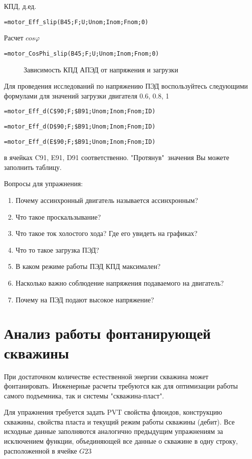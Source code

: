 КПД, д.ед.

{ \small  \texttt{=motor\_Eff\_slip(B45;F;U;Unom;Inom;Fnom;0)}}

Расчет $cos \varphi $

{ \small  \texttt{=motor\_CosPhi\_slip(B45;F;U;Unom;Inom;Fnom;0)}}


\begin{figure}[h!]
	\center{\texttt{[image: Ex80\_3]}}
	\caption{Зависимость КПД АПЭД от напряжения и загрузки}
	\label{ris:Ex80_3}
\end{figure}

Для проведения исследований по напряжению ПЭД воспользуйтесь следующими формулами для значений загрузки двигателя 0.6, 0.8, 1 

{ \small  \texttt{=motor\_Eff\_d(C\$90;F;\$B91;Unom;Inom;Fnom;ID)}}

{ \small  \texttt{=motor\_Eff\_d(D\$90;F;\$B91;Unom;Inom;Fnom;ID)}}

{ \small  \texttt{=motor\_Eff\_d(E\$90;F;\$B91;Unom;Inom;Fnom;ID)}}

в ячейках C91, E91, D91 соответственно. "Протянув"\ значения Вы можете заполнить таблицу.

Вопросы для упражнения:

\begin{enumerate}
	\item Почему ассинхронный двигатель называется ассинхронным?
	\item Что такое проскальзывание?
	\item Что такое ток холостого хода? Где его увидеть на графиках?
	\item Что то такое загрузка ПЭД?
	\item В каком режиме работы ПЭД КПД максимален?
	\item Насколько важно соблюдение напряжения подаваемого на двигатель?
	\item Почему на ПЭД подают высокое напряжение?
\end{enumerate}


\section{Анализ работы фонтанирующей скважины}

При достаточном количестве естественной энергии скважина может фонтанировать. Инженерные расчеты требуются как для оптимизации работы самого подъемника, так и системы "скважина-пласт".

Для упражнения требуется задать PVT свойства флюидов, конструкцию скважины, свойства пласта и текущий режим работы скважины (дебит). Все исходные данные заполняются аналогично предыдущим упражнениям за исключением функции, объединяющей все данные о скважине в одну строку, расположенной в ячейке  $G23$

